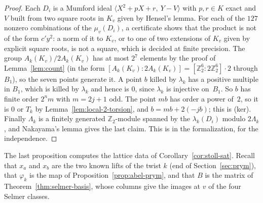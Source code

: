 \documentclass[11pt]{amsart}
\theoremstyle{definition}
\numberwithin{equation}{section}
\newcommand{\Zt}{\mathbb{Z}_2}
\newcommand{\kv}{K_v}
\begin{document}
\begin{proof}
Each $D_i$ is a Mumford ideal $\langle X^2+pX+r,\ Y-V\rangle$ with $p,r\in K$ exact and $V$ built from two square roots in $\kv$ given by Hensel's lemma. For each of the $127$ nonzero combinations of the $\mu_v(D_i)$, a certificate shows that the product is not of the form $c'y^2$: a norm of it to $\kv$, or to one of two extensions of $\kv$ given by explicit square roots, is not a square, which is decided at finite precision. The group $A_k(\kv)/2A_k(\kv)$ has at most $2^7$ elements by the proof of Lemma~\ref{lem:count} (in the form $[A_k(\kv):2A_k(\kv)]=[\Zt^6:2\Zt^6]\cdot2$ through $B_1$), so the seven points generate it. A point $b$ killed by $\lambda_k$ has a positive multiple in $B_1$, which is killed by $\lambda_k$ and hence is $0$, since $\lambda_k$ is injective on~$B_1$. So $b$ has finite order $2^nm$ with $m=2j+1$ odd. The point $mb$ has order a power of~$2$, so it is $0$ or $T_k$ by Lemma~\ref{lem:local-2-torsion}, and $b=mb+2(-jb)$; this is (ker). Finally $\Lambda_k$ is a finitely generated $\Zt$-module spanned by the $\lambda_k(D_i)$ modulo $2\Lambda_k$, and Nakayama's lemma gives the last claim. This is  in the formalization, for the independence.
\end{proof}

The last proposition computes the lattice data of Corollary~\ref{cor:stoll-sat}. Recall that $x_a$ and $x_b$ are the two known lifts of the twist $k$ (end of Section~\ref{sec:prym}), that $\varphi_k$ is the map of Proposition~\ref{prop:abel-prym}, and that $B$ is the matrix of Theorem~\ref{thm:selmer-basis}, whose columns give the images at $v$ of the four Selmer classes.
\end{document}
